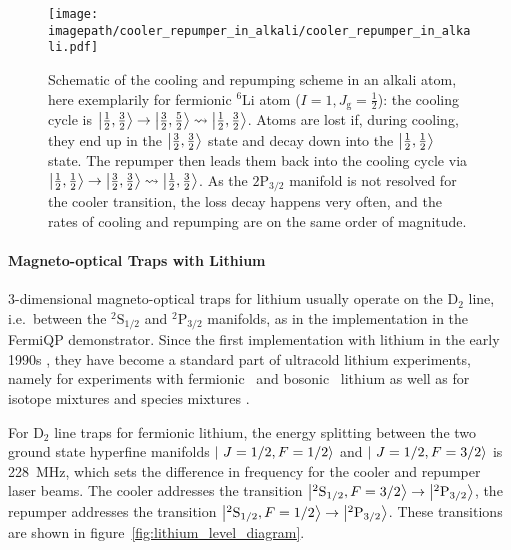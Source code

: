 \begin{figure}
    \centering
    \texttt{[image: \\imagepath/cooler\_repumper\_in\_alkali/cooler\_repumper\_in\_alkali.pdf]}
    \caption{Schematic of the cooling and repumping scheme in an alkali atom, here exemplarily for fermionic $^6$Li atom ($I = 1, J_\text{g} = \frac{1}{2}$): the cooling cycle is $\Ket{\frac{1}{2}, \frac{3}{2}} \rightarrow \Ket{\frac{3}{2}, \frac{5}{2}} \rightsquigarrow \Ket{\frac{1}{2}, \frac{3}{2}}$. Atoms are lost if, during cooling, they end up in the $\Ket{\frac{3}{2}, \frac{3}{2}}$ state and decay down into the $\Ket{\frac{1}{2}, \frac{1}{2}}$ state. The repumper then leads them back into the cooling cycle via $\Ket{\frac{1}{2}, \frac{1}{2}} \rightarrow \Ket{\frac{3}{2}, \frac{3}{2}} \rightsquigarrow \Ket{\frac{1}{2}, \frac{3}{2}}$. As the $2\text{P}_{3/2}$ manifold is not resolved for the cooler transition, the loss decay happens very often, and the rates of cooling and repumping are on the same order of magnitude.}
    \label{fig:cooler_repumper_in_alkali}
\end{figure}


\paragraph{Magneto-optical Traps with Lithium}
3-dimensional magneto-optical traps for lithium usually operate on the D$_2$ line, i.e.~between the $^2\text{S}_{1/2}$ and $^2\text{P}_{3/2}$ manifolds, as in the implementation in the FermiQP demonstrator. Since the first implementation with lithium in the early 1990s \cite{kawanaka_decay_1993}, they have become a standard part of ultracold lithium experiments, namely for experiments with fermionic~\cite{duarte_all-optical_2011,omran_microscopic_2015} and bosonic~\cite{kawanaka_decay_1993,schunemann_magneto-optic_1998} lithium as well as for isotope mixtures \cite{mewes_simultaneous_1999, hilker_laser_2012,kerkmann_novel_2019} and species mixtures \cite{ladouceur_compact_2009,tiecke_high-flux_2009,chen_lithium-cesium_2021}. 

For D$_2$ line traps for fermionic lithium, the energy splitting between the two ground state hyperfine manifolds $\Ket{~J=1/2, F=1/2}$ and $\Ket{~J=1/2, F=3/2}$ is \SI{228}{\mega\hertz}, which sets the difference in frequency for the cooler and repumper laser beams. The cooler addresses the transition $\Ket{^2\text{S}_{1/2}, F = 3/2} \rightarrow \Ket{^2\text{P}_{3/2}}$, the repumper addresses the transition $\Ket{^2\text{S}_{1/2}, F = 1/2} \rightarrow \Ket{^2\text{P}_{3/2}}$. These transitions are shown in figure~\ref{fig:lithium_level_diagram}.

